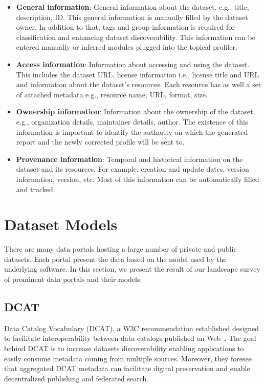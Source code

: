 \documentclass[runningheads,a4paper]{llncs}
\begin{document}
\begin{itemize}
\item \textbf{General information}: General information about the dataset. e.g., title, description, ID. This general information is manually filled by the dataset owner. In addition to that, tags and group information is required for classification and enhancing dataset discoverability. This information can be entered manually or inferred modules plugged into the topical profiler.

\item \textbf{Access information}: Information about accessing and using the dataset. This includes the dataset URL, license information i.e., license title and URL and information about the dataset's resources. Each resource has as well a set of attached metadata e.g., resource name, URL, format, size.

\item \textbf{Ownership information}: Information about the ownership of the dataset. e.g., organization details, maintainer details, author. The existence of this information is important to identify the authority on which the generated report and the newly corrected profile will be sent to.

\item \textbf{Provenance information}: Temporal and historical information on the dataset and its resources. For example, creation and update dates, version information, version, etc. Most of this information can be automatically filled and tracked.
\end{itemize}


\section{Dataset Models}
\label{sec:models}

There are many data portals hosting a large number of private and public datasets. Each portal present the data based on the model used by the underlying software. In this section, we present the result of our landscape survey of prominent data portals and their models.

\subsection{DCAT}

Data Catalog Vocabulary (DCAT), a W3C recommendation established designed to facilitate interoperability between data catalogs published on Web~\cite{Erickson:14:DCV}. The goal behind DCAT is to increase datasets discoverability enabling applications to easily consume metadata coming from multiple sources. Moreover, they foresee that aggregated DCAT metadata can facilitate digital preservation and enable decentralized publishing and federated search.
\end{document}
